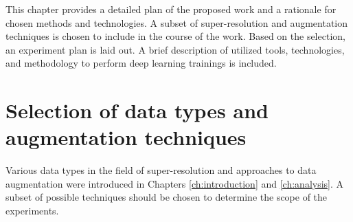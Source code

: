 This chapter provides a detailed plan of the proposed work and a rationale for chosen methods and technologies.
A subset of super-resolution and augmentation techniques is chosen to include in the course of the work.
Based on the selection, an experiment plan is laid out.
A brief description of utilized tools, technologies, and methodology to perform deep learning trainings is included.

\section{Selection of data types and augmentation techniques}
Various data types in the field of super-resolution and approaches to data augmentation were introduced in Chapters \ref{ch:introduction} and \ref{ch:analysis}.
A subset of possible techniques should be chosen to determine the scope of the experiments.


